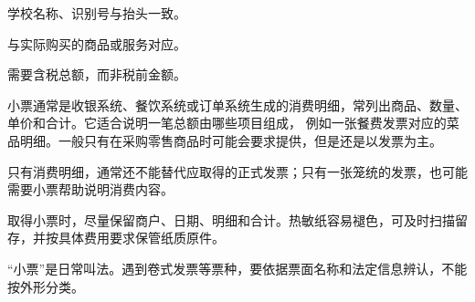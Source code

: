 \par\vspace{6pt}\begin{minipage}[t]{.31\linewidth}\sffamily\fontsize{9}{16}\selectfont \textcolor{BookPurple}{}\par\vspace{3pt}学校名称、识别号与抬头一致。\end{minipage}\hfill\begin{minipage}[t]{.31\linewidth}\sffamily\fontsize{9}{16}\selectfont \textcolor{BookPurple}{}\par\vspace{3pt}与实际购买的商品或服务对应。\end{minipage}\hfill\begin{minipage}[t]{.31\linewidth}\sffamily\fontsize{9}{16}\selectfont \textcolor{BookPurple}{}\par\vspace{3pt}需要含税总额，而非税前金额。\end{minipage}\par

\vspace{2cm}

\label{receipts}
小票通常是收银系统、餐饮系统或订单系统生成的消费明细，常列出商品、数量、单价和合计。它适合说明一笔总额由哪些项目组成，
例如一张餐费发票对应的菜品明细。一般只有在采购零售商品时可能会要求提供，但是还是以发票为主。

\begin{TeachingPair}
只有消费明细，通常还不能替代应取得的正式发票；只有一张笼统的发票，也可能需要小票帮助说明消费内容。

取得小票时，尽量保留商户、日期、明细和合计。热敏纸容易褪色，可及时扫描留存，并按具体费用要求保管纸质原件。\SideColumn
\begin{SideNote}
“小票”是日常叫法。遇到卷式发票等票种，要依据票面名称和法定信息辨认，不能按外形分类。

\end{SideNote}
\end{TeachingPair}


